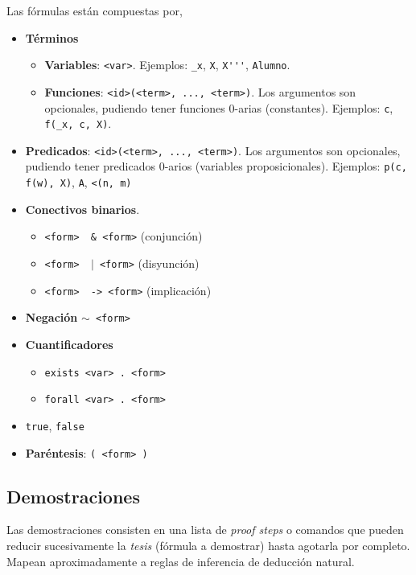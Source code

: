 Las fórmulas están compuestas por,

\begin{itemize}
    \item \textbf{Términos}
    \begin{itemize}
        \item \textbf{Variables}: \texttt{<var>}. Ejemplos: \lstinline{_x},
        \lstinline{X}, \lstinline{X'''}, \lstinline{Alumno}.
        \item \textbf{Funciones}: \texttt{<id>(<term>, ..., <term>)}. Los
        argumentos son opcionales, pudiendo tener funciones 0-arias
        (constantes). Ejemplos:  \lstinline{c}, \lstinline{f(_x, c, X)}.
    \end{itemize}
    \item \textbf{Predicados}: \texttt{<id>(<term>, ..., <term>)}. Los
    argumentos son opcionales, pudiendo tener predicados 0-arios (variables
    proposicionales). Ejemplos: \lstinline{p(c, f(w), X)}, \lstinline{A},
    \lstinline{<(n, m)}
    \item \textbf{Conectivos binarios}.
    \begin{itemize}
        \item \texttt{<form> \ \& <form>} (conjunción)
        \item \texttt{<form> \ $\mid$ <form>} (disyunción)
        \item \texttt{<form> \ ->\ <form>} (implicación)
    \end{itemize}
    \item \textbf{Negación} \texttt{$\sim$ <form>}
    \item \textbf{Cuantificadores}
    \begin{itemize}
        \item \texttt{exists <var> . <form>}
        \item \texttt{forall <var> . <form>}
    \end{itemize}
    \item \texttt{true}, \texttt{false}
    \item \textbf{Paréntesis}: \texttt{( <form>\ )}
\end{itemize}


\subsection{Demostraciones}

Las demostraciones consisten en una lista de \textit{proof steps} o comandos que
pueden reducir sucesivamente la \textit{tesis} (fórmula a demostrar) hasta
agotarla por completo. Mapean aproximadamente a reglas de inferencia de
deducción natural.

